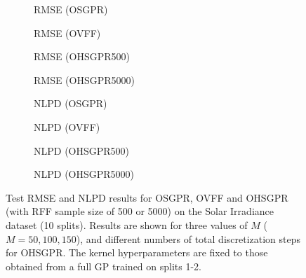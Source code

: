 \begin{figure}[htbp]
\captionsetup[subfigure]{font=scriptsize,labelfont=scriptsize}
  \centering
   \begin{subfigure}[b]{0.24\textwidth}
      \centering
      \scalebox{0.35}{
      
      }
      \caption{RMSE (OSGPR)}
      \label{fig:solar_rmse_iter}
  \end{subfigure}
  \begin{subfigure}[b]{0.24\textwidth}
      \centering
      \scalebox{0.35}{
      
      }
      \caption{RMSE (OVFF)}
      \label{fig:solar_rmse_vff}
  \end{subfigure}
  \begin{subfigure}[b]{0.24\textwidth}
      \centering
      \scalebox{0.35}{
      
      }
      \caption{RMSE (OHSGPR500)}
      \label{fig:solar_rmse_disc_500}
  \end{subfigure}
  \begin{subfigure}[b]{0.24\textwidth}
      \centering
      \scalebox{0.35}{
      
      }
      \caption{RMSE (OHSGPR5000)}
      \label{fig:solar_rmse_disc_5000}
  \end{subfigure}
  \begin{subfigure}[b]{0.24\textwidth}
      \centering
      \scalebox{0.35}{
      
      }
      \caption{NLPD (OSGPR)}
      \label{fig:solar_nlpd_iter}
  \end{subfigure}
  \begin{subfigure}[b]{0.24\textwidth}
      \centering
      \scalebox{0.35}{
      
      }
      \caption{NLPD (OVFF)}
      \label{fig:solar_nlpd_vff}
  \end{subfigure}
  \begin{subfigure}[b]{0.24\textwidth}
      \centering
      \scalebox{0.35}{
      
      }
      \caption{NLPD (OHSGPR500)}
      \label{fig:solar_nlpd_disc_500}
  \end{subfigure}
  \begin{subfigure}[b]{0.24\textwidth}
      \centering
      \scalebox{0.35}{
      
      }
      \caption{NLPD (OHSGPR5000)}
      \label{fig:solar_nlpd_disc_5000}
  \end{subfigure}
  \caption{Test RMSE and NLPD results for OSGPR, OVFF and OHSGPR (with RFF sample size of 500 or 5000) on the Solar Irradiance dataset (10 splits). Results are shown for three values of $M$ ($M = 50, 100, 150$), and different numbers of total discretization steps for OHSGPR. The kernel hyperparameters are fixed to those obtained from a full GP trained on splits 1-2.}
  \label{fig:solar_comparison_disc_fixed_kernel}
\end{figure}

